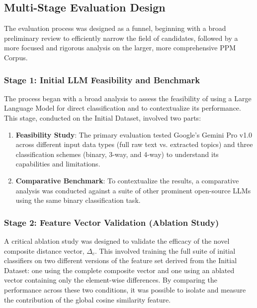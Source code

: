 \subsection{Multi-Stage Evaluation Design}\label{ch:3.4.1}
The evaluation process was designed as a funnel, beginning with a broad preliminary review to efficiently narrow the field of candidates, followed by a more focused and rigorous analysis on the larger, more comprehensive PPM Corpus.

\subsubsection{Stage 1: Initial LLM Feasibility and Benchmark}
The process began with a broad analysis to assess the feasibility of using a Large Language Model for direct classification and to contextualize its performance. This stage, conducted on the Initial Dataset, involved two parts:
\begin{enumerate}
    \item \textbf{Feasibility Study}: The primary evaluation tested Google's Gemini Pro v1.0 across different input data types (full raw text vs. extracted topics) and three classification schemes (binary, 3-way, and 4-way) to understand its capabilities and limitations.
    \item \textbf{Comparative Benchmark}: To contextualize the results, a comparative analysis was conducted against a suite of other prominent open-source LLMs using the same binary classification task.
\end{enumerate}

\subsubsection{Stage 2: Feature Vector Validation (Ablation Study)}\label{ch:3.4.1.1}
A critical ablation study was designed to validate the efficacy of the novel composite distance vector, \(\Delta_c\). This involved training the full suite of initial classifiers on two different versions of the feature set derived from the Initial Dataset: one using the complete composite vector and one using an ablated vector containing only the element-wise differences. By comparing the performance across these two conditions, it was possible to isolate and measure the contribution of the global cosine similarity feature.

